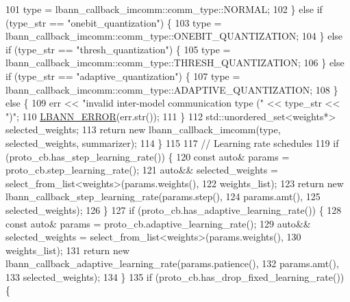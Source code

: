 \begin{DoxyCode}
101       type = lbann\_callback\_imcomm::comm\_type::NORMAL;
102     \} \textcolor{keywordflow}{else} \textcolor{keywordflow}{if} (type\_str == \textcolor{stringliteral}{"onebit\_quantization"}) \{
103       type = lbann\_callback\_imcomm::comm\_type::ONEBIT\_QUANTIZATION;
104     \} \textcolor{keywordflow}{else} \textcolor{keywordflow}{if} (type\_str == \textcolor{stringliteral}{"thresh\_quantization"}) \{
105       type = lbann\_callback\_imcomm::comm\_type::THRESH\_QUANTIZATION;
106     \} \textcolor{keywordflow}{else} \textcolor{keywordflow}{if} (type\_str == \textcolor{stringliteral}{"adaptive\_quantization"}) \{
107       type = lbann\_callback\_imcomm::comm\_type::ADAPTIVE\_QUANTIZATION;
108     \} \textcolor{keywordflow}{else} \{
109       err << \textcolor{stringliteral}{"invalid inter-model communication type ("} << type\_str << \textcolor{stringliteral}{")"};
110       \hyperlink{base_8hpp_a80b1d707117e968a6951b7222e4b2b87}{LBANN\_ERROR}(err.str());
111     \}
112     std::unordered\_set<weights*> selected\_weights; 
113     \textcolor{keywordflow}{return} \textcolor{keyword}{new} lbann\_callback\_imcomm(type, selected\_weights, summarizer);
114   \}
115 
117   \textcolor{comment}{// Learning rate schedules}
119 \textcolor{comment}{}  \textcolor{keywordflow}{if} (proto\_cb.has\_step\_learning\_rate()) \{
120     \textcolor{keyword}{const} \textcolor{keyword}{auto}& params = proto\_cb.step\_learning\_rate();
121     \textcolor{keyword}{auto}&& selected\_weights = select\_from\_list<weights>(params.weights(),
122                                                         weights\_list);
123     \textcolor{keywordflow}{return} \textcolor{keyword}{new} lbann\_callback\_step\_learning\_rate(params.step(),
124                                                  params.amt(),
125                                                  selected\_weights);
126   \}
127   \textcolor{keywordflow}{if} (proto\_cb.has\_adaptive\_learning\_rate()) \{
128     \textcolor{keyword}{const} \textcolor{keyword}{auto}& params = proto\_cb.adaptive\_learning\_rate();
129     \textcolor{keyword}{auto}&& selected\_weights = select\_from\_list<weights>(params.weights(),
130                                                         weights\_list);
131     \textcolor{keywordflow}{return} \textcolor{keyword}{new} lbann\_callback\_adaptive\_learning\_rate(params.patience(),
132                                                      params.amt(),
133                                                      selected\_weights);
134   \}
135   \textcolor{keywordflow}{if} (proto\_cb.has\_drop\_fixed\_learning\_rate()) \{

\end{DoxyCode}
